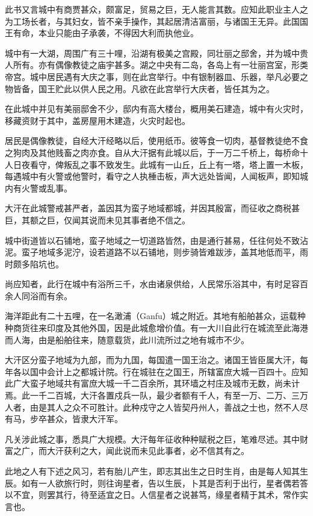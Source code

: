 \documentclass[12pt,UTF8]{ctexbook}
\begin{document}
此书又言城中有商贾甚众，颇富足，贸易之巨，无人能言其数。应知此职业主人之为工场长者，与其妇女，皆不亲手操作，其起居清洁富丽，与诸国王无异。此国国王有命，本业只能由子承袭，不得因大利而执他业。

城中有一大湖，周围广有三十哩，沿湖有极美之宫殿，同壮丽之邸舍，并为城中贵人所有。亦有偶像教徒之庙宇甚多。湖之中央有二岛，各岛上有一壮丽宫室，形类帝宫。城中居民遇有大庆之事，则在此宫举行。中有银制器皿、乐器，举凡必要之物皆备，国王贮此以供人民之用。凡欲在此宫举行大庆者，皆任其为之。

在此城中并见有美丽邸舍不少，邸内有高大楼台，概用美石建造，城中有火灾时，移藏资财于其中，盖房屋用木建造，火灾时起也。

居民是偶像教徒，自经大汗经略以后，使用纸币。彼等食一切肉，基督教徒绝不食之狗肉及其他贱畜之肉亦食。自从大汗据有此城以后，于一万二千桥上，每桥命十人日夜看守，俾叛乱之事不致发生。此城有一山丘，丘上有一塔，塔上置一木板，每遇城中有火警或他警时，看守之人执棰击板，声大远处皆闻，人闻板声，即知城内有火警或乱事。

大汗在此城警戒甚严者，盖因其为蛮子地域都城，并因其殷富，而征收之商税甚巨，其额之巨，仅闻其说而未见其事者绝不信之。

城中街道皆以石铺地，蛮子地域之一切道路皆然，由是通行甚易，任往何处不致沾泥。蛮子地域多泥泞，设若道路不以石铺地，则步骑皆难跋涉，盖其地低而平，雨时颇多陷坑也。

尚应知者，此行在城中有浴所三千，水由诸泉供给，人民常乐浴其中，有时足容百余人同浴而有余。

海洋距此有二十五哩，在一名澉浦（Ganfu）城之附近。其地有船舶甚众，运载种种商货往来印度及其他外国，因是此城愈增价值。有一大川自此行在城流至此海港而人海，由是船舶往来，随意载货，此川流所过之地有城市不少。

大汗区分蛮子地域为九部，而为九国，每国遣一国王治之。诸国王皆臣属大汗，每年各以国中会计上之都城计院。行在城驻在之国王，所辖富庶大城一百四十。应知此广大蛮子地域共有富庶大城一千二百余所，其环墙之村庄及城市无数，尚未计焉。此一千二百城，大汗各置戍兵一队，最少者额有千人，有至一万、二万、三万人者，由是其人之众不可胜计。此种戍守之人皆契丹州人，善战之士也，然不人尽有马，步卒甚众，皆隶大汗军。

凡关涉此城之事，悉具广大规模。大汗每年征收种种赋税之巨，笔难尽述。其中财富之广，而大汗获利之大，闻此说而未见此事者，必不信其有之。

此地之人有下述之风习，若有胎儿产生，即志其出生之日时生肖，由是每人知其生辰。如有一人欲旅行时，则往询星者，告以生辰，卜其是否利于出行，星者偶若答以不宜，则罢其行，待至适宜之日。人信星者之说甚笃，缘星者精于其术，常作实言也。
\end{document}
